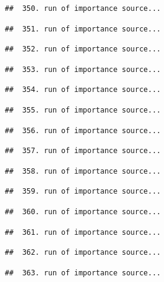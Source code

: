 \documentclass[
]{article}
\begin{document}
\begin{verbatim}
##  350. run of importance source...
\end{verbatim}

\begin{verbatim}
##  351. run of importance source...
\end{verbatim}

\begin{verbatim}
##  352. run of importance source...
\end{verbatim}

\begin{verbatim}
##  353. run of importance source...
\end{verbatim}

\begin{verbatim}
##  354. run of importance source...
\end{verbatim}

\begin{verbatim}
##  355. run of importance source...
\end{verbatim}

\begin{verbatim}
##  356. run of importance source...
\end{verbatim}

\begin{verbatim}
##  357. run of importance source...
\end{verbatim}

\begin{verbatim}
##  358. run of importance source...
\end{verbatim}

\begin{verbatim}
##  359. run of importance source...
\end{verbatim}

\begin{verbatim}
##  360. run of importance source...
\end{verbatim}

\begin{verbatim}
##  361. run of importance source...
\end{verbatim}

\begin{verbatim}
##  362. run of importance source...
\end{verbatim}

\begin{verbatim}
##  363. run of importance source...
\end{verbatim}
\end{document}
